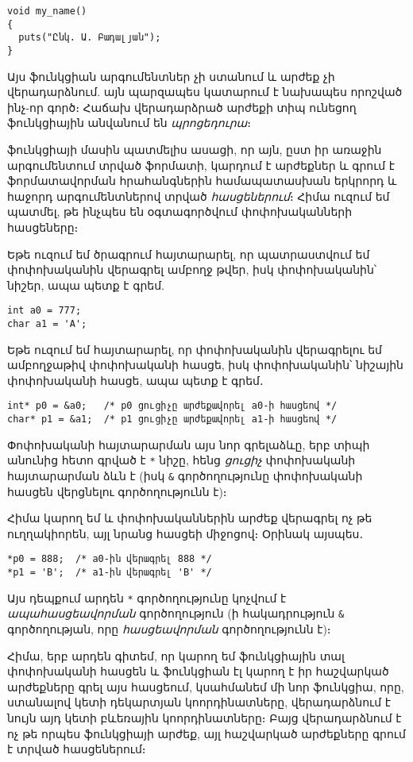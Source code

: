\begin{Verbatim}
void my_name()
{
  puts("Ընկ. Ա. Բադալյան");
}
\end{Verbatim}

Այս ֆունկցիան արգումենտներ չի ստանում և արժեք չի վերադարձնում. այն
պարզապես կատարում է նախապես որոշված ինչ-որ գործ։ Հաճախ 
վերադարձրած արժեքի տիպ ունեցող ֆունկցիային անվանում են
\emph{պրոցեդուրա}։

 ֆունկցիայի մասին պատմելիս ասացի, որ այն,
ըստ իր առաջին արգումենտում տրված ֆորմատի, կարդում է արժեքներ և գրում
է ֆորմատավորման հրահանգներին համապատասխան երկրորդ և հաջորդ արգումենտներով
տրված \emph{հասցեներում}։ Հիմա ուզում եմ պատմել,
թե ինչպես են օգտագործվում փոփոխականների հասցեները։

Եթե ուզում եմ ծրագրում հայտարարել, որ պատրաստվում եմ  փոփոխականին
վերագրել ամբողջ թվեր, իսկ  փոփոխականին՝ նիշեր, ապա պետք է գրեմ.

\begin{Verbatim}
int a0 = 777;
char a1 = 'A';
\end{Verbatim}

Եթե ուզում եմ հայտարարել, որ  փոփոխականին վերագրելու եմ ամբողջաթիվ
փոփոխականի հասցե, իսկ  փոփոխականին՝ նիշային փոփոխականի հասցե,
ապա պետք է գրեմ․

\begin{Verbatim}
int* p0 = &a0;   /* p0 ցուցիչը արժեքավորել a0-ի հասցեով */
char* p1 = &a1;  /* p1 ցուցիչը արժեքավորել a1-ի հասցեով */
\end{Verbatim}

Փոփոխականի հայտարարման այս նոր գրելաձևը, երբ տիպի անունից հետո գրված
է \verb|*| նիշը, հենց \emph{ցուցիչ} փոփոխականի հայտարարման ձևն է (իսկ
\verb|&| գործողությունը փոփոխականի հասցեն վերցնելու գործողությունն է)։

Հիմա կարող եմ  և  փոփոխականներին արժեք վերագրել ոչ թե
ուղղակիորեն, այլ նրանց հասցեի միջոցով։ Օրինակ այսպես․

\begin{Verbatim}
*p0 = 888;  /* a0-ին վերագրել 888 */
*p1 = 'B';  /* a1-ին վերագրել 'B' */
\end{Verbatim}

Այս դեպքում արդեն \verb|*| գործողությունը կոչվում է \emph{ապահասցեավորման}
գործողություն (ի հակադրություն \verb|&| գործողության, որը \emph{հասցեավորման}
գործողությունն է)։

Հիմա, երբ արդեն գիտեմ, որ կարող եմ ֆունկցիային տալ փոփոխականի հասցեն և
ֆունկցիան էլ կարող է իր հաշվարկած արժեքները գրել այս հասցեում, կսահմանեմ
մի նոր ֆունկցիա, որը, ստանալով կետի դեկարտյան կոորդինատները, վերադարձնում
է նույն այդ կետի բևեռային կոորդինատները։ Բայց վերադարձնում է ոչ թե որպես
ֆունկցիայի արժեք, այլ հաշվարկած արժեքները գրում է տրված հասցեներում։

